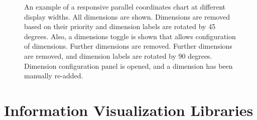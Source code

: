 \begin{figure}[tp]
{
An example of a responsive parallel coordinates chart at different display widths.  All dimensions are shown.  Dimensions are removed based on their priority and dimension labels are rotated by 45 degrees. Also, a dimensions toggle is shown that allows configuration of dimensions.  Further dimensions are removed.  Further dimensions are removed, and dimension labels are rotated by 90 degrees.  Dimension configuration panel is opened, and a dimension has been manually re-added.
}
\label{fig:RespParCoordExample}
\end{figure}


\section{Information Visualization Libraries}







